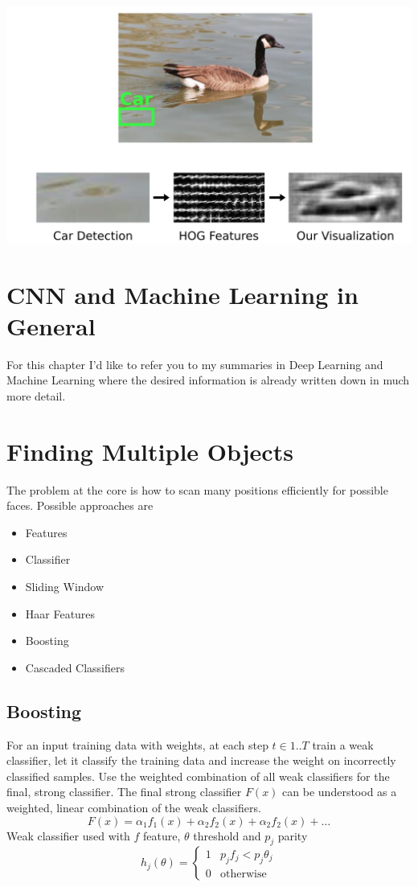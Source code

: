 \documentclass[x11names,11pt,a4paper]{article}
\theoremstyle{definition}
\begin{document}
\begin{center}
	\includegraphics[width=0.6\linewidth]{img/HOGles}
\end{center}

\section{CNN and Machine Learning in General}
For this chapter I'd like to refer you to my summaries in Deep Learning and Machine Learning where the desired information is already written down in much more detail.

\section{Finding Multiple Objects}
The problem at the core is how to scan many positions efficiently for possible faces. Possible approaches are
\begin{itemize}[label=-, nosep]
	\item {\color{DodgerBlue4} Features}
	\item {\color{DodgerBlue4} Classifier}
	\item {\color{DodgerBlue4} Sliding Window}
	\item {\color{Firebrick1} Haar Features}
	\item {\color{Firebrick1} Boosting}
	\item {\color{Firebrick1} Cascaded Classifiers}
\end{itemize}

\subsection{Boosting}
For an input training data with weights, at each step $t \in 1..T$ train a weak classifier, let it classify the training data and increase the weight on incorrectly classified samples. Use the weighted combination of all weak classifiers for the final, strong classifier. The final strong classifier $F(x)$ can be understood as a weighted, linear combination of the weak classifiers.
\begin{equation*}
	F(x) = \alpha_1 f_1(x) + \alpha_2 f_2(x) + \alpha_2 f_2(x) + \dots
\end{equation*}
Weak classifier used with $f$ feature, $\theta$ threshold and $p_j$ parity
\begin{equation*}
	h_j (\theta) = \left\{ \begin{matrix}
		1 & p_j f_j < p_j \theta_j\\
		0 & \text{otherwise}
		\end{matrix} \right.
\end{equation*}
\end{document}
